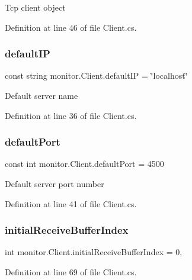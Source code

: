 Tcp client object 



Definition at line 46 of file Client.\+cs.

\mbox{\label{classmonitor_1_1_client_a326a20fe68a86757e16a6e45b8012640}} 
\subsubsection{default\+IP}
{\footnotesize\ttfamily const string monitor.\+Client.\+default\+IP = \char`\"{}localhost\char`\"{}}



Default server name 



Definition at line 36 of file Client.\+cs.

\mbox{\label{classmonitor_1_1_client_ad0a9bfc361ccef7443625f399e67f84a}} 
\subsubsection{default\+Port}
{\footnotesize\ttfamily const int monitor.\+Client.\+default\+Port = 4500}



Default server port number 



Definition at line 41 of file Client.\+cs.

\mbox{\label{classmonitor_1_1_client_afbbf4cf14d1a11747f6103e726dee77e}} 
\subsubsection{initial\+Receive\+Buffer\+Index}
{\footnotesize\ttfamily int monitor.\+Client.\+initial\+Receive\+Buffer\+Index = 0\hspace{0.3cm}{\ttfamily [static]}, {\ttfamily [private]}}



Definition at line 69 of file Client.\+cs.

